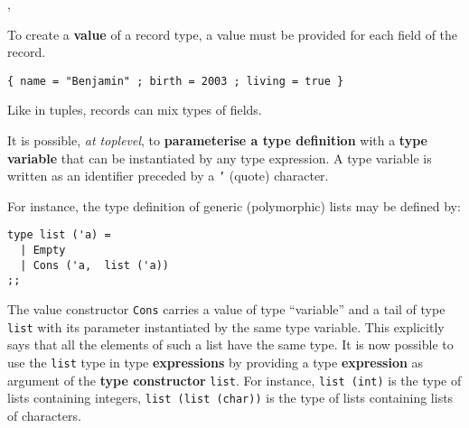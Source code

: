 \vspace{0.2cm}
\begin{syn}
 \is
   \tok{=}  \tok{;}
\sep
{} \is
     \tok{=}
  \tok{\{}  \tok{\}}
\end{syn}

\vspace{0.2cm}

To create a {\bf value} of a record type, a value
must be provided for each field of the record.

{\scriptsize
\begin{lstlisting}
{ name = "Benjamin" ; birth = 2003 ; living = true }
\end{lstlisting}}

Like in tuples, records can mix types of fields.

\vspace{0.5cm}

It is possible, {\em at toplevel}, to {\bf parameterise a type
  definition} with a {\bf type variable} that
can be instantiated by any type expression. A type variable is written
as an identifier preceded by a {\tt '} (quote) character.

 For instance, the type
definition of generic (polymorphic) lists may be defined by:

{\scriptsize
\begin{lstlisting}
type list ('a) =
  | Empty
  | Cons ('a,  list ('a))
;;
\end{lstlisting}}

The value
constructor {\tt Cons} carries a value of type ``variable''
and a tail of type
{\tt list} with its parameter instantiated by the same type
variable. This explicitly says that all the elements of such a list
have the same type. It is now possible to use the {\tt list} type in
type {\bf expressions} by providing a type {\bf expression} as
argument of the {\bf type constructor} {\tt list}. For instance,
{\tt list (int)} is the type of lists containing integers,
{\tt list (list (char))} is the type of lists containing lists of
characters.

